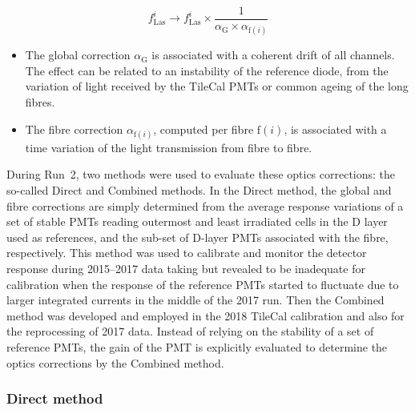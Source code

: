 \begin{equation}
    f_{\mathrm{Las}}^i \to f_{\mathrm{Las}}^i \times \frac{1}{\alpha_{\mathrm{G}} \times \alpha_{\mathrm{f}(i)}}
    \label{eq:fLaserOpticsCorrections}
\end{equation}

\begin{itemize}                                                                               
\item The global correction $\alpha_{\mathrm{G}}$ is associated with a coherent drift of all channels. The effect can be related to an instability of the reference diode, from the variation of light received by the TileCal PMTs or common ageing of the long fibres.
                                                                                       
\item The fibre correction $\alpha_{\mathrm{f}(i)}$, computed per fibre $\mathrm{f}(i)$, is associated with a time variation of the light transmission from fibre to fibre.
\end{itemize}                                                                                

During Run~2, two methods were used to evaluate these optics corrections: the so-called Direct and Combined methods. In the Direct method, the global and fibre corrections are simply determined from the average response variations of a set of stable PMTs reading outermost and least irradiated cells in the D layer used as references, and the sub-set of D-layer PMTs associated with the fibre, respectively. 
This method was used to calibrate and monitor the detector response during 2015--2017 data taking but revealed to be inadequate for calibration when the response of the reference PMTs started to fluctuate due to larger integrated currents in the middle of the 2017 run. Then the Combined method was developed and employed in the 2018 TileCal calibration and also for the reprocessing of 2017 data. Instead of relying on the stability of a set of reference PMTs, the gain of the PMT is explicitly evaluated to determine the optics corrections by the Combined method.


\subsubsection*{Direct method}

